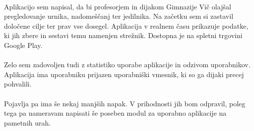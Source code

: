 \paragraph{}Aplikacijo sem napisal, da bi profesorjem in dijakom Gimnazije Vič olajšal pregledovanje urnika, nadomeščanj ter jedilnika. Na začetku sem si zastavil določene cilje ter prav vse dosegel. Aplikacija v realnem času prikazuje podatke, ki jih zbere in sestavi temu namenjen strežnik. Dostopna je na spletni trgovini Google Play.

\paragraph{}Zelo sem zadovoljen tudi z statistiko uporabe aplikacije in odzivom uporabnikov. Aplikacija ima uporabniku prijazen uporabniški vmesnik, ki so ga dijaki precej pohvalili.

\paragraph{}Pojavlja pa ima še nekaj manjših napak. V prihodnosti jih bom odpravil, poleg tega pa nameravam napisati še poseben modul za uporabno aplikacije na pametnih urah.

